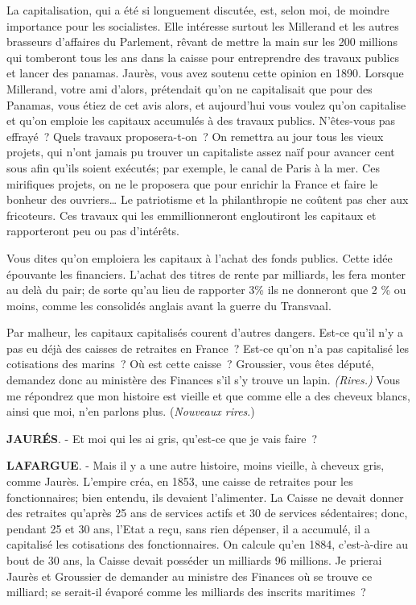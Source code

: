 \documentclass[french,twoside]{book} %
\begin{document}
La capitalisation, qui a été si longuement discutée, est, selon moi, de moindre importance pour les socialistes. Elle intéresse surtout les Millerand et les autres brasseurs d’affaires du Parlement, rêvant de mettre la main sur les 200 millions qui tomberont tous les ans dans la caisse pour entreprendre des travaux publics et lancer des panamas. Jaurès, vous avez soutenu cette opinion en 1890. Lorsque Millerand, votre ami d’alors, prétendait qu’on ne capitalisait que pour des Panamas, vous étiez de cet avis alors, et aujourd’hui vous voulez qu’on capitalise et qu’on emploie les capitaux accumulés à des travaux publics. N'êtes-vous pas effrayé ? Quels travaux proposera-t-on ? On remettra au jour tous les vieux projets, qui n’ont jamais pu trouver un capitaliste assez naïf pour avancer cent sous afin qu’ils soient exécutés; par exemple, le canal de Paris à la mer. Ces mirifiques projets, on ne le proposera que pour enrichir la France et faire le bonheur des ouvriers… Le patriotisme et la philanthropie ne coûtent pas cher aux fricoteurs. Ces travaux qui les emmillionneront engloutiront les capitaux et rapporteront peu ou pas d’intérêts.\par
Vous dites qu’on emploiera les capitaux à l’achat des fonds publics. Cette idée épouvante les financiers. L'achat des titres de rente par milliards, les fera monter au delà du pair; de sorte qu’au lieu de rapporter 3\% ils ne donneront que 2 \% ou moins, comme les consolidés anglais avant la guerre du Transvaal.\par
Par malheur, les capitaux capitalisés courent d’autres dangers. Est-ce qu’il n’y a pas eu déjà des caisses de retraites en  France ? Est-ce qu’on n’a pas capitalisé les cotisations des marins ? Où est cette caisse ? Groussier, vous êtes député, demandez donc au ministère des Finances s’il s’y trouve un lapin.\emph{ (Rires.)} Vous me répondrez que mon histoire est vieille et que comme elle a des cheveux blancs, ainsi que moi, n’en parlons plus. (\emph{Nouveaux rires}.)\par
\textbf{JAURÉS}. - Et moi qui les ai gris, qu’est-ce que je vais faire ?\par
\textbf{LAFARGUE}. - Mais il y a une autre histoire, moins vieille, à cheveux gris, comme Jaurès. L'empire créa, en 1853, une caisse de retraites pour les fonctionnaires; bien entendu, ils devaient l’alimenter. La Caisse ne devait donner des retraites qu’après 25 ans de services actifs et 30 de services sédentaires; donc, pendant 25 et 30 ans, l’Etat a reçu, sans rien dépenser, il a accumulé, il a capitalisé les cotisations des fonctionnaires. On calcule qu’en 1884, c’est-à-dire au bout de 30 ans, la Caisse devait posséder un milliards 96 millions. Je prierai Jaurès et Groussier de demander au ministre des Finances où se trouve ce milliard; se serait-il évaporé comme les milliards des inscrits maritimes ?\par
\end{document}

